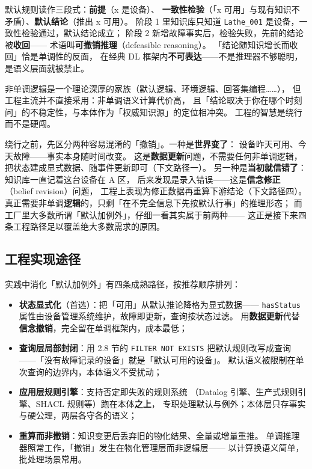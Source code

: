 默认规则读作三段式：\textbf{前提}（x 是设备）、
\textbf{一致性检验}（「x 可用」与现有知识不矛盾）、\textbf{默认结论}（推出 x 可用）。
阶段 1 里知识库只知道 \texttt{Lathe\_001} 是设备，一致性检验通过，默认结论成立；
阶段 2 新增故障事实后，检验失败，先前的结论被\textbf{收回}——
术语叫\textbf{可撤销推理}（defeasible reasoning）。
「结论随知识增长而收回」恰是单调性的反面，
在经典 DL 框架内\textbf{不可表达}——不是推理器不够聪明，是语义层面就被禁止。

非单调逻辑是一个理论深厚的家族（默认逻辑、环境逻辑、回答集编程……），
但工程主流并不直接采用：非单调语义计算代价高，
且「结论取决于你在哪个时刻问」的不稳定性，与本体作为「权威知识源」的定位相冲突。
工程的智慧是绕行而不是硬闯。

绕行之前，先区分两种容易混淆的「撤销」。一种是\textbf{世界变了}：
设备昨天可用、今天故障——事实本身随时间改变。
这是\textbf{数据更新}问题，不需要任何非单调逻辑，
把状态建成显式数据、随事件更新即可（下文路径一）。
另一种是\textbf{当初就信错了}：知识库一直记着这台设备在 A 区，
后来发现是录入错误——这是\textbf{信念修正}（belief revision）问题，
工程上表现为修正数据再重算下游结论（下文路径四）。
真正需要非单调\textbf{逻辑}的，只剩「在不完全信息下先按默认行事」的推理形态；
而工厂里大多数所谓「默认加例外」，仔细一看其实属于前两种——
这正是接下来四条工程路径足以覆盖绝大多数需求的原因。

\subsection{工程实现途径}

实践中消化「默认加例外」有四条成熟路径，按推荐顺序排列：

\begin{itemize}
\item \textbf{状态显式化}（首选）：把「可用」从默认推论降格为显式数据——
      \texttt{hasStatus} 属性由设备管理系统维护，故障即更新，查询按状态过滤。
      用\textbf{数据更新}代替\textbf{信念撤销}，完全留在单调框架内，成本最低；
\item \textbf{查询层局部封闭}：用 2.8 节的 \texttt{FILTER NOT EXISTS}
      把默认规则改写成查询——「没有故障记录的设备」就是「默认可用的设备」。
      默认语义被限制在单次查询的边界内，本体语义不受扰动；
\item \textbf{应用层规则引擎}：支持否定即失败的规则系统
      （Datalog 引擎、生产式规则引擎、SHACL 规则等）跑在本体\textbf{之上}，
      专职处理默认与例外；本体层只存事实与硬公理，两层各守各的语义；
\item \textbf{重算而非撤销}：知识变更后丢弃旧的物化结果、全量或增量重推。
      单调推理器照常工作，「撤销」发生在物化管理层而非逻辑层——
      以计算换语义简单，批处理场景常用。
\end{itemize}

